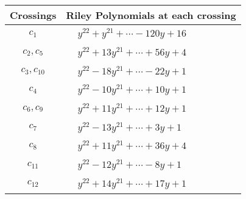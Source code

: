 \documentclass[1p]{elsarticle_modified}
\theoremstyle{definition}
\begin{document}
\begin{tabular}{m{50pt}|m{274pt}}
Crossings & \hspace{64pt}Riley Polynomials at each crossing \\
\hline $$\begin{aligned}c_{1}\end{aligned}$$&$\begin{aligned}
&y^{22}+y^{21}+\cdots-120 y+16
\end{aligned}$\\
\hline $$\begin{aligned}c_{2},c_{5}\end{aligned}$$&$\begin{aligned}
&y^{22}+13 y^{21}+\cdots+56 y+4
\end{aligned}$\\
\hline $$\begin{aligned}c_{3},c_{10}\end{aligned}$$&$\begin{aligned}
&y^{22}-18 y^{21}+\cdots-22 y+1
\end{aligned}$\\
\hline $$\begin{aligned}c_{4}\end{aligned}$$&$\begin{aligned}
&y^{22}-10 y^{21}+\cdots+10 y+1
\end{aligned}$\\
\hline $$\begin{aligned}c_{6},c_{9}\end{aligned}$$&$\begin{aligned}
&y^{22}+11 y^{21}+\cdots+12 y+1
\end{aligned}$\\
\hline $$\begin{aligned}c_{7}\end{aligned}$$&$\begin{aligned}
&y^{22}-13 y^{21}+\cdots+3 y+1
\end{aligned}$\\
\hline $$\begin{aligned}c_{8}\end{aligned}$$&$\begin{aligned}
&y^{22}+11 y^{21}+\cdots+36 y+4
\end{aligned}$\\
\hline $$\begin{aligned}c_{11}\end{aligned}$$&$\begin{aligned}
&y^{22}-12 y^{21}+\cdots-8 y+1
\end{aligned}$\\
\hline $$\begin{aligned}c_{12}\end{aligned}$$&$\begin{aligned}
&y^{22}+14 y^{21}+\cdots+17 y+1
\end{aligned}$\\
\hline
\end{tabular}\\~\\
\end{document}
